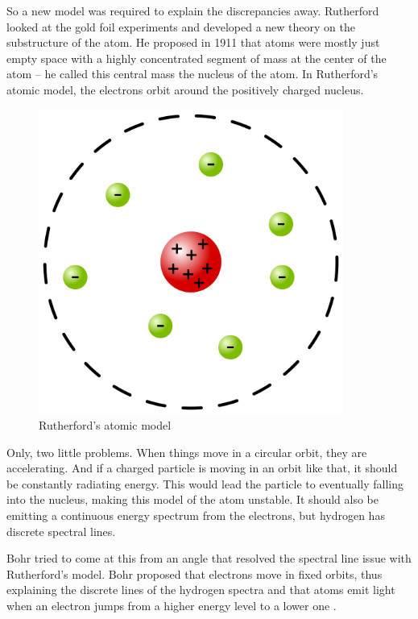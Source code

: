 So a new model was required to explain the discrepancies away.
Rutherford looked at the gold foil experiments and developed a new theory on the substructure of the atom\cite{Baily}.
He proposed in 1911 that atoms were mostly just empty space with a highly concentrated segment of mass at the center of the atom -- he called this central mass the nucleus of the atom.
In Rutherford's atomic model, the electrons orbit around the positively charged nucleus\cite{Rutherford_1911}.

\begin{figure}[H]
  \centering
  \includegraphics[width=100mm]{figures/rutherford.png}
  \caption{Rutherford's atomic model\cite{Rutherford_model}}
  \label{rutherford}
\end{figure}

Only, two little problems.
When things move in a circular orbit, they are accelerating. 
And if a charged particle is moving in an orbit like that, it should be constantly radiating energy.
This would lead the particle to eventually falling into the nucleus, making this model of the atom unstable.
It should also be emitting a continuous energy spectrum from the electrons, but hydrogen has discrete spectral lines\cite{Kopot}.

Bohr tried to come at this from an angle that resolved the spectral line issue with Rutherford's model.
Bohr proposed that electrons move in fixed orbits, thus explaining the discrete lines of the hydrogen spectra and that atoms emit light when an electron jumps from a higher energy level to a lower one \cite{Bohr_1913}.

